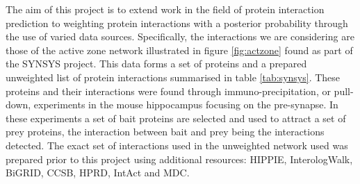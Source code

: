 The aim of this project is to extend work in the field of protein interaction prediction \autocites{qi_evaluation_2006,mcdowall_pips:_2009,rodgers-melnick_predicting_2013,von_mering_string:_2005} to weighting protein interactions with a posterior probability through the use of varied data sources.
Specifically, the interactions we are considering are those of the active zone network illustrated in figure \ref{fig:actzone} found as part of the SYNSYS project\autocite{synsys}.
This data forms a set of proteins and a prepared unweighted list of protein interactions summarised in table \ref{tab:synsys}.
These proteins and their interactions were found through immuno-precipitation, or pull-down, experiments in the mouse hippocampus focusing on the pre-synapse.
In these experiments a set of bait proteins are selected and used to attract a set of prey proteins, the interaction between bait and prey being the interactions detected.
The exact set of interactions used in the unweighted network used was prepared prior to this project using additional resources: HIPPIE\autocite{schaefer_hippie:_2012}, InterologWalk\autocite{gallone_bio::homology::interologwalk_2011}, BiGRID\autocite{stark_biogrid:_2006}, CCSB\autocite{yu_high-quality_2008}, HPRD\autocite{baolin_hprd:_2007}, IntAct\autocite{hermjakob_intact:_2004} and MDC\autocite{futschik_comparison_2007}.

